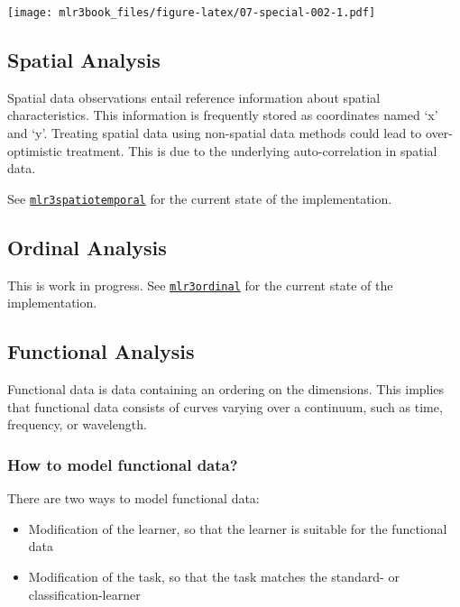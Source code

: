 \documentclass[]{article}
\providecommand{\tightlist}{%
  \setlength{\itemsep}{0pt}\setlength{\parskip}{0pt}}
\begin{document}
\texttt{[image: mlr3book\_files/figure-latex/07-special-002-1.pdf]}

\hypertarget{spatial}{%
\subsection{Spatial Analysis}\label{spatial}}

Spatial data observations entail reference information about spatial characteristics.
This information is frequently stored as coordinates named `x' and `y'.
Treating spatial data using non-spatial data methods could lead to over-optimistic treatment.
This is due to the underlying auto-correlation in spatial data.

See \href{https://github.com/mlr-org/mlr3spatiotemporal}{\texttt{mlr3spatiotemporal}} for the current state of the implementation.

\hypertarget{ordinal}{%
\subsection{Ordinal Analysis}\label{ordinal}}

This is work in progress.
See \href{https://github.com/mlr-org/mlr3ordinal}{\texttt{mlr3ordinal}} for the current state of the implementation.

\hypertarget{functional}{%
\subsection{Functional Analysis}\label{functional}}

Functional data is data containing an ordering on the dimensions.
This implies that functional data consists of curves varying over a continuum, such as time, frequency, or wavelength.

\hypertarget{how-to-model-functional-data}{%
\subsubsection{How to model functional data?}\label{how-to-model-functional-data}}

There are two ways to model functional data:

\begin{itemize}
\tightlist
\item
  Modification of the learner, so that the learner is suitable for the functional data
\item
  Modification of the task, so that the task matches the standard- or classification-learner
\end{itemize}
\end{document}
